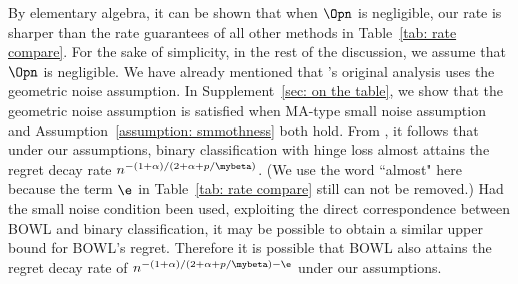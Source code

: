 \documentclass[preprint] {imsart}
\begin{document}
  By elementary algebra, it can be shown that when $\Opn$ is negligible, our rate is sharper than the rate guarantees of all  other methods in Table~\ref{tab: rate compare}. For the sake of simplicity, in the rest of the discussion, we assume that $\Opn$ is negligible.  We have already mentioned that \cite{zhao2015}'s original analysis uses the geometric noise assumption. In Supplement~\ref{sec: on the table}, we show that the geometric noise assumption is satisfied when MA-type small noise assumption  and Assumption~\ref{assumption: smmothness} both hold. From \cite{steinwart2007}, it follows that  under our  assumptions, binary classification with hinge loss almost attains the regret decay rate $n^{-(1+\alpha)/(2+\alpha+p/\mybeta)}$. (We use the word ``almost" here because the term $\e$ in Table~\ref{tab: rate compare} still can not be removed.)
  Had the small noise condition been used, exploiting the direct correspondence between BOWL and binary classification, it may be possible to obtain a similar upper bound for BOWL's regret. Therefore it is possible that BOWL also attains the regret decay rate of $n^{-(1+\alpha)/(2+\alpha+p/\mybeta)-\e}$   under our  assumptions.
  
\end{document}
